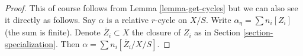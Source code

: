 \documentclass{stacks-project}
\theoremstyle{plain}
\theoremstyle{definition}
\theoremstyle{remark}
\numberwithin{equation}{subsection}
\begin{document}
\begin{proof}
This of course follows from Lemma \ref{lemma-get-cycles} but we can
also see it directly as follows. Say $\alpha$ is a relative $r$-cycle
on $X/S$. Write $\alpha_\eta = \sum n_i[Z_i]$ (the sum is finite). Denote
$\overline{Z}_i \subset X$ the closure of $Z_i$ as in
Section \ref{section-specialization}. Then
$\alpha = \sum n_i[\overline{Z}_i/X/S]$.
\end{proof}
\end{document}
